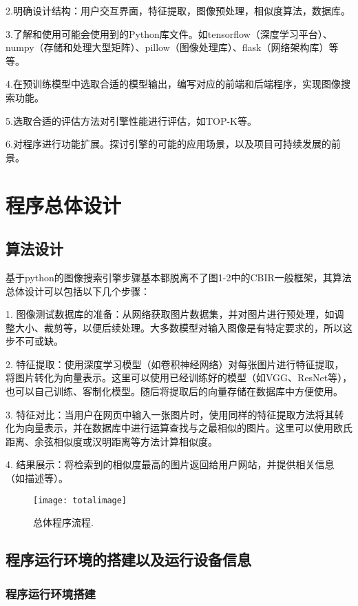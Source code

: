 \documentclass[bachelor_p]{hdu-thesis}
\begin{document}
2.明确设计结构：用户交互界面，特征提取，图像预处理，相似度算法，数据库。

3.了解和使用可能会使用到的Python库文件。如tensorflow（深度学习平台）、numpy（存储和处理大型矩阵）、pillow（图像处理库）、flask（网络架构库）等等。

4.在预训练模型中选取合适的模型输出，编写对应的前端和后端程序，实现图像搜索功能。

5.选取合适的评估方法对引擎性能进行评估，如TOP-K等。

6.对程序进行功能扩展。探讨引擎的可能的应用场景，以及项目可持续发展的前景。


\chapter{程序总体设计}

\section{算法设计}

基于python的图像搜索引擎步骤基本都脱离不了图1-2中的CBIR一般框架，其算法总体设计可以包括以下几个步骤：

1. 图像测试数据库的准备：从网络获取图片数据集，并对图片进行预处理，如调整大小、裁剪等，以便后续处理。大多数模型对输入图像是有特定要求的，所以这步不可或缺。

2. 特征提取：使用深度学习模型（如卷积神经网络）对每张图片进行特征提取，将图片转化为向量表示。这里可以使用已经训练好的模型（如VGG、ResNet等），也可以自己训练、客制化模型。随后将提取后的向量存储在数据库中方便使用。

3. 特征对比：当用户在网页中输入一张图片时，使用同样的特征提取方法将其转化为向量表示，并在数据库中进行运算查找与之最相似的图片。这里可以使用欧氏距离、余弦相似度或汉明距离等方法计算相似度。

4. 结果展示：将检索到的相似度最高的图片返回给用户网站，并提供相关信息（如描述等）。

\begin{figure}[!htb]
  \centering
  \texttt{[image: totalimage]}
  \caption{总体程序流程.}
  \label{fig_totalimage}
\end{figure}

\section{程序运行环境的搭建以及运行设备信息}

\subsection{程序运行环境搭建}
\end{document}

